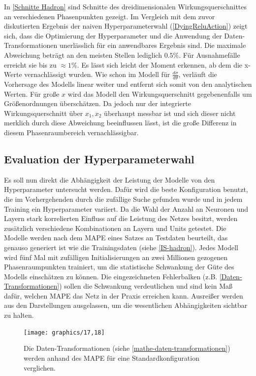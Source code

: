 In \textsf{\autoref{Schnitte Hadron}} sind Schnitte des dreidimensionalen Wirkungsquerschnittes an verschiedenen Phasenpunkten gezeigt. Im Vergleich mit dem zuvor diskutierten Ergebnis der naiven Hyperparameterwahl (\textsf{\autoref{DyingReluAction}}) zeigt sich, dass die Optimierung der Hyperparameter und die Anwendung der Daten-Transformationen unerlässlich für ein anwendbares Ergebnis sind. Die maximale Abweichung beträgt an den meisten Stellen lediglich $0.5\%$. Für Ausnahmefälle erreicht sie bis zu $\approx 1\%$. Es lässt sich leicht der Moment erkennen, ab dem die x-Werte vernachlässigt wurden. Wie schon im Modell für $\frac{d\sigma}{d\theta}$, verläuft die Vorhersage des Modells linear weiter und entfernt sich somit von den analytischen Werten. Für große $x$ wird das Modell den Wirkungsquerschnitt gegebenenfalls um Größenordnungen überschätzen. Da jedoch nur der integrierte Wirkungsquerschnitt über $x_1, x_2$ überhaupt messbar ist und sich dieser nicht merklich durch diese Abweichung beeinflussen lässt, ist die große Differenz in diesem Phasenraumbereich vernachlässigbar. 
\subsection{Evaluation der Hyperparameterwahl}
\label{Vergleich}
Es soll nun direkt die Abhängigkeit der Leistung der Modelle von den Hyperparameter untersucht werden. Dafür wird die beste Konfiguration benutzt, die im Vorhergehenden durch die zufällige Suche gefunden wurde und in jedem Training ein Hyperparameter variiert. Da die Wahl der Anzahl an Neuronen und Layern stark korrelierten Einfluss auf die Leistung des Netzes besitzt, werden zusätzlich verschiedene Kombinationen an Layern und Units getestet. Die Modelle werden nach dem MAPE eines Satzes an Testdaten beurteilt, das genauso generiert ist wie die Trainingsdaten (siehe \textsf{\autoref{IS-hadron}}). Jedes Modell wird fünf Mal mit zufälligen Initialisierungen an zwei Millionen gezogenen Phasenraumpunkten trainiert, um die statistische Schwankung der Güte des Modells einschätzen zu können. Die eingezeichneten Fehlerbalken (z.B. \textsf{\autoref{Daten-Transformationen}}) sollen die Schwankung verdeutlichen und sind kein Maß dafür, welchen MAPE das Netz in der Praxis erreichen kann. Ausreißer werden aus den Darstellungen ausgelassen, um die wesentlichen Abhängigkeiten sichtbar zu halten. 
\begin{figure}[b!] 
	\centering
	\texttt{[image: graphics/17,18]}
	\caption{Die Daten-Transformationen (siehe \textsf{\autoref{mathe-daten-transformationen}}) werden anhand des MAPE für eine Standardkonfiguration verglichen.}
	\label{Daten-Transformationen}
\end{figure}

